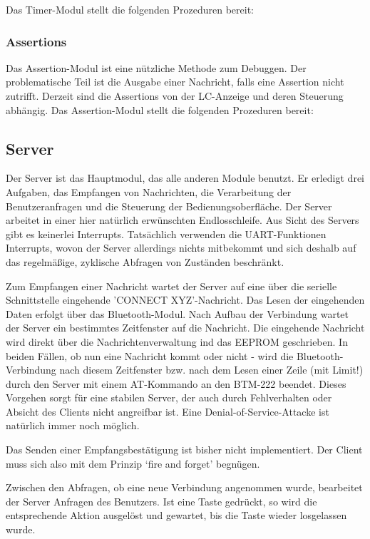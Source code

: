 \documentclass[ngerman]{article}
\begin{document}
Das Timer-Modul stellt die folgenden Prozeduren bereit:



\subsubsection{Assertions}

Das Assertion-Modul ist eine nützliche Methode zum Debuggen.
Der problematische Teil ist die Ausgabe einer Nachricht, falls
eine Assertion nicht zutrifft. Derzeit sind die Assertions
von der LC-Anzeige und deren Steuerung abhängig. Das Assertion-Modul
stellt die folgenden Prozeduren bereit:




\subsection{Server}

Der Server ist das Hauptmodul, das alle anderen Module benutzt. Er
erledigt drei Aufgaben, das Empfangen von Nachrichten, die Verarbeitung
der Benutzeranfragen und die Steuerung der Bedienungsoberfläche. Der Server arbeitet in einer
hier natürlich erwünschten Endlosschleife. Aus Sicht des Servers gibt es
keinerlei Interrupts. Tatsächlich verwenden die UART-Funktionen Interrupts, 
wovon der Server allerdings nichts mitbekommt und sich deshalb auf das
re\-gel\-mä\-ßige, zyklische Abfragen von Zuständen beschränkt.

Zum Empfangen einer Nachricht wartet der Server auf eine über die
serielle Schnittstelle eingehende 'CONNECT XYZ'-Nachricht. Das Lesen
der eingehenden Daten erfolgt über das Bluetooth-Modul. Nach Aufbau
der Verbindung wartet der Server ein bestimmtes Zeitfenster auf die 
Nachricht. Die eingehende Nachricht wird direkt über die Nachrichtenverwaltung
ind das EEPROM ge\-schrie\-ben. In beiden Fällen, ob nun eine Nachricht kommt
oder nicht - wird die Bluetooth-Verbindung nach diesem Zeitfenster bzw. nach
dem Lesen einer Zeile (mit Limit!) durch den Server mit einem AT-Kommando
an den BTM-222 beendet. Dieses Vorgehen sorgt für eine stabilen Server, der auch
durch Fehlverhalten oder Absicht des Clients nicht angreifbar ist. Eine
Denial-of-Service-Attacke ist natürlich immer noch möglich.

Das Senden einer Empfangsbestätigung ist bisher nicht implementiert. Der
Client muss sich also mit dem Prinzip `fire and forget' begnügen.

Zwischen den Abfragen, ob eine neue Verbindung angenommen wurde, bearbeitet
der Server Anfragen des Benutzers. Ist eine Taste gedrückt, so wird die
entsprechende Aktion ausgelöst und gewartet, bis die Taste wieder losgelassen
wurde.
\end{document}
